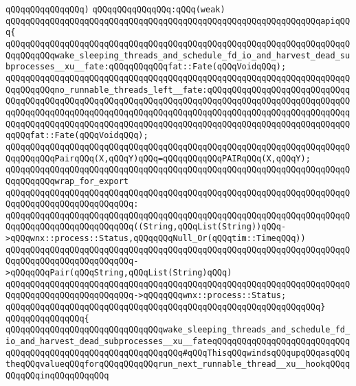 \verb|qQQqqQQqqQQqqQQq)|\newline
\verb|qQQqqQQqqQQqqQQq:qQQq(weak)|\newline
\verb|qQQqqQQqqQQqqQQqqQQqqQQqqQQqqQQqqQQqqQQqqQQqqQQqqQQqqQQqqQQqqQQqapiqQQq{|\newline
\verb|qQQqqQQqqQQqqQQqqQQqqQQqqQQqqQQqqQQqqQQqqQQqqQQqqQQqqQQqqQQqqQQqqQQqqQQqqQQqqQQqwake_sleeping_threads_and_schedule_fd_io_and_harvest_dead_subprocesses__xu__fate:qQQqqQQqqQQqfat::Fate(qQQqVoidqQQq);|\newline
\verb|qQQqqQQqqQQqqQQqqQQqqQQqqQQqqQQqqQQqqQQqqQQqqQQqqQQqqQQqqQQqqQQqqQQqqQQqqQQqqQQqno_runnable_threads_left__fate:qQQqqQQqqQQqqQQqqQQqqQQqqQQqqQQqqQQqqQQqqQQqqQQqqQQqqQQqqQQqqQQqqQQqqQQqqQQqqQQqqQQqqQQqqQQqqQQqqQQqqQQqqQQqqQQqqQQqqQQqqQQqqQQqqQQqqQQqqQQqqQQqqQQqqQQqqQQqqQQqqQQqqQQqqQQqqQQqqQQqqQQqqQQqqQQqqQQqqQQqqQQqqQQqqQQqqQQqqQQqqQQqqQQqqQQqqQQqqQQqqQQqfat::Fate(qQQqVoidqQQq);|\newline
\newline
\verb|qQQqqQQqqQQqqQQqqQQqqQQqqQQqqQQqqQQqqQQqqQQqqQQqqQQqqQQqqQQqqQQqqQQqqQQqqQQqqQQqPairqQQq(X,qQQqY)qQQq=qQQqqQQqqQQqPAIRqQQq(X,qQQqY);|\newline
\newline
\verb|qQQqqQQqqQQqqQQqqQQqqQQqqQQqqQQqqQQqqQQqqQQqqQQqqQQqqQQqqQQqqQQqqQQqqQQqqQQqqQQqwrap_for_export|\newline
\verb|qQQqqQQqqQQqqQQqqQQqqQQqqQQqqQQqqQQqqQQqqQQqqQQqqQQqqQQqqQQqqQQqqQQqqQQqqQQqqQQqqQQqqQQqqQQqqQQq:|\newline
\verb|qQQqqQQqqQQqqQQqqQQqqQQqqQQqqQQqqQQqqQQqqQQqqQQqqQQqqQQqqQQqqQQqqQQqqQQqqQQqqQQqqQQqqQQqqQQqqQQq((String,qQQqList(String))qQQq->qQQqwnx::process::Status,qQQqqQQqNull_Or(qQQqtim::TimeqQQq))|\newline
\verb|qQQqqQQqqQQqqQQqqQQqqQQqqQQqqQQqqQQqqQQqqQQqqQQqqQQqqQQqqQQqqQQqqQQqqQQqqQQqqQQqqQQqqQQqqQQqqQQq->qQQqqQQqPair(qQQqString,qQQqList(String)qQQq)|\newline
\verb|qQQqqQQqqQQqqQQqqQQqqQQqqQQqqQQqqQQqqQQqqQQqqQQqqQQqqQQqqQQqqQQqqQQqqQQqqQQqqQQqqQQqqQQqqQQqqQQq->qQQqqQQqwnx::process::Status;|\newline
\verb|qQQqqQQqqQQqqQQqqQQqqQQqqQQqqQQqqQQqqQQqqQQqqQQqqQQqqQQqqQQqqQQq}|\newline
\verb|qQQqqQQqqQQqqQQq{|\newline
\verb|qQQqqQQqqQQqqQQqqQQqqQQqqQQqqQQqwake_sleeping_threads_and_schedule_fd_io_and_harvest_dead_subprocesses__xu__fateqQQqqQQqqQQqqQQqqQQqqQQqqQQqqQQqqQQqqQQqqQQqqQQqqQQqqQQqqQQqqQQq#qQQqThisqQQqwindsqQQqupqQQqasqQQqtheqQQqvalueqQQqforqQQqqQQqqQQqrun_next_runnable_thread__xu__hookqQQqqQQqqQQqinqQQqqQQqqQQq|\newline
